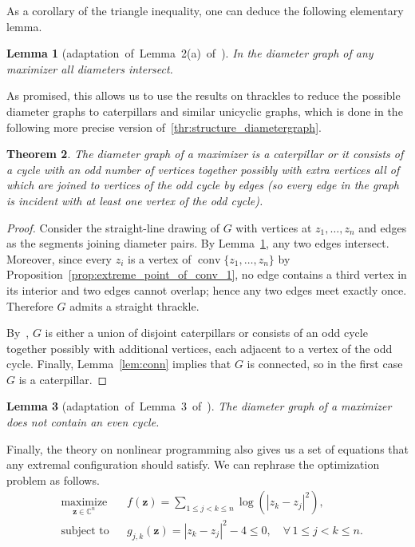 \documentclass{article}
\newtheorem{thr}{Theorem}
\newtheorem{lem}[thr]{Lemma}
\theoremstyle{definition}
\newcommand{\C}{\mathbb{C}}
\let\le\leqslant
\let\leq\leqslant
\begin{document}
As a corollary of the triangle inequality, one can deduce the following elementary lemma.

\begin{lem}[adaptation~of~Lemma~2(a)~of~\cite{Datta1997ADI}]\label{lem:DiametersIntersect}
In the diameter graph of any maximizer all diameters intersect.
\end{lem}

As promised, this allows us to use the results on thrackles to reduce the possible diameter graphs to caterpillars and similar unicyclic graphs, which is done in the following more precise version of~\cref{thr:structure_diametergraph}.

\begin{thr}\label{thm:Woodall}
The diameter graph of a maximizer is a caterpillar or it consists of a cycle with an odd number of vertices together possibly with extra vertices all of which are joined to vertices of the odd cycle by edges (so every edge in the graph is incident with at least one vertex of the odd cycle).
\end{thr}

\begin{proof}
Consider the straight-line drawing of $G$ with vertices at $z_1,\dots,z_n$ and edges
as the segments joining diameter pairs.
By Lemma~\ref{lem:DiametersIntersect}, any two edges intersect.
Moreover, since every $z_i$ is a vertex of $\operatorname{conv}\{z_1,\dots,z_n\}$ by Proposition~\ref{prop:extreme_point_of_conv_1},
no edge contains a third vertex in its interior and two edges cannot overlap;
hence any two edges meet exactly once.
Therefore $G$ admits a straight thrackle.

By~\cite[Theorem~2]{woodall1971thrackles}, $G$ is either a union of disjoint
caterpillars or consists of an odd cycle together possibly with additional vertices,
each adjacent to a vertex of the odd cycle.
Finally, Lemma~\ref{lem:conn} implies that $G$ is connected, so in the first case
$G$ is a caterpillar.
\end{proof}



\begin{lem}[adaptation~of~Lemma~3~of~\cite{Datta1997ADI}]
    \label{lem:NoC4}
    The diameter graph of a maximizer does not contain an even cycle.
\end{lem}




Finally, the theory on nonlinear programming also gives us a set of equations that any extremal configuration should satisfy.
We can rephrase the optimization problem as follows.
\begin{equation}
\begin{aligned}
& \underset{\mathbf{z}\in \C^n}{\text{maximize}}
& & f(\mathbf{z}) = \sum_{1 \le j < k \le n} \log \left( |z_k - z_j|^2 \right), \\
& \text{subject to}
& & g_{j,k}(\mathbf{z}) = |z_k - z_j|^2 - 4 \leq 0, \quad \forall \, 1 \le j < k \le n.
\end{aligned}
\tag{NLP}\label{NLPKKT}
\end{equation}
\end{document}
